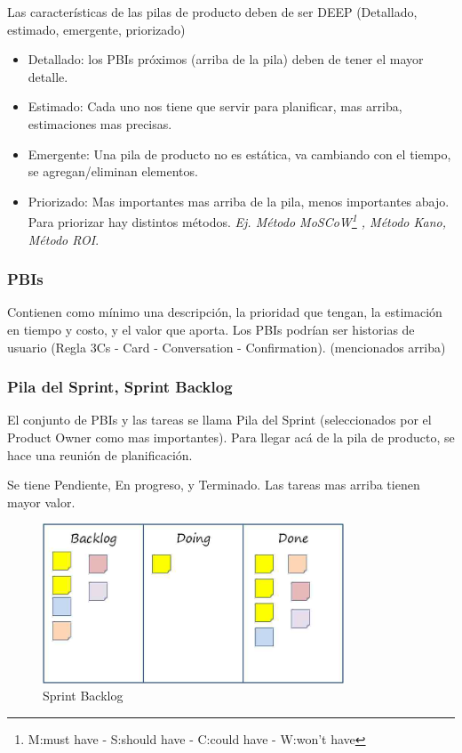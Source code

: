 \documentclass[titlepage,a4paper]{article}
\begin{document}
Las características de las pilas de producto deben de ser DEEP (Detallado, estimado, emergente, priorizado)
\begin{itemize}
    \item Detallado: los PBIs próximos (arriba de la pila) deben de tener el mayor detalle.
    \item Estimado: Cada uno nos tiene que servir para planificar, mas arriba, estimaciones mas precisas.
    \item Emergente: Una pila de producto no es estática, va cambiando con el tiempo, se agregan/eliminan elementos.
    \item Priorizado: Mas importantes mas arriba de la pila, menos importantes abajo. Para priorizar hay distintos métodos. \textit{Ej. Método MoSCoW\footnote{M:must have - S:should have - C:could have - W:won't have}
    , Método Kano, Método ROI}.
\end{itemize}

\subsubsection*{PBIs}
Contienen como mínimo una descripción, la prioridad que tengan, la estimación en tiempo y costo, y el valor que aporta. Los PBIs podrían ser historias de usuario (Regla 3Cs - Card - Conversation - Confirmation). (mencionados arriba)

\subsubsection*{Pila del Sprint, Sprint Backlog}
El conjunto de PBIs y las tareas se llama Pila del Sprint (seleccionados por el Product Owner como mas importantes). Para llegar acá de la pila de producto, se hace una reunión de planificación.

Se tiene Pendiente, En progreso, y Terminado. Las tareas mas arriba tienen mayor valor.

\begin{figure}[!htb]
    \centering
    \includegraphics[width=0.8\textwidth]{Imagenes/SprintBacklog.jpg}
    \caption{Sprint Backlog}
\end{figure}
\end{document}
